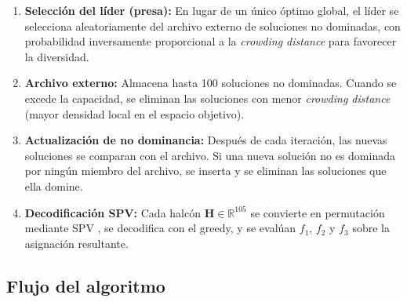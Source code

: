\documentclass[12pt,letterpaper]{article}
\begin{document}
\begin{enumerate}
    \item \textbf{Selección del líder (presa):} En lugar de un único óptimo global, el líder se selecciona aleatoriamente del archivo externo de soluciones no dominadas, con probabilidad inversamente proporcional a la \textit{crowding distance} para favorecer la diversidad.

    \item \textbf{Archivo externo:} Almacena hasta 100 soluciones no dominadas. Cuando se excede la capacidad, se eliminan las soluciones con menor \textit{crowding distance} (mayor densidad local en el espacio objetivo).

    \item \textbf{Actualización de no dominancia:} Después de cada iteración, las nuevas soluciones se comparan con el archivo. Si una nueva solución no es dominada por ningún miembro del archivo, se inserta y se eliminan las soluciones que ella domine.

    \item \textbf{Decodificación SPV:} Cada halcón $\mathbf{H} \in \mathbb{R}^{105}$ se convierte en permutación mediante SPV \parencite{bean1994}, se decodifica con el greedy, y se evalúan $f_1$, $f_2$ y $f_3$ sobre la asignación resultante.
\end{enumerate}

\subsection{Flujo del algoritmo}
\end{document}
